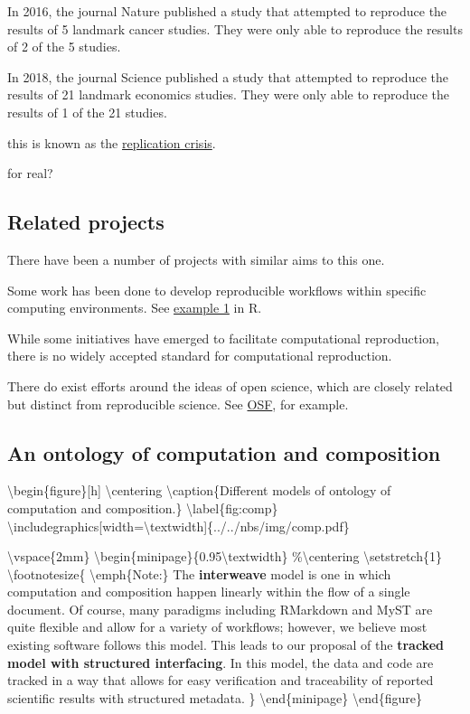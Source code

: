 In 2016, the journal Nature published a study that attempted to reproduce the results of 5 landmark cancer studies. They were only able to reproduce the results of 2 of the 5 studies.

In 2018, the journal Science published a study that attempted to reproduce the results of 21 landmark economics studies. They were only able to reproduce the results of 1 of the 21 studies.

this is known as the \href{https://en.wikipedia.org/wiki/Replication\_crisis}{replication crisis}.

for real?

\hypertarget{related-projects}{%
\subsection{Related projects}\label{related-projects}}

There have been a number of projects with similar aims to this one.

Some work has been done to develop reproducible workflows within specific computing environments. See \href{https://mine-cetinkaya-rundel.github.io/improve-repro-workflow-reproducibilitea-2020/}{example 1} in R.

While some initiatives have emerged to facilitate computational reproduction, there is no widely accepted standard for computational reproduction. 

There do exist efforts around the ideas of open science, which are closely related but distinct from reproducible science. See \href{https://osf.io/tvyxz/}{OSF}, for example.

\hypertarget{an-ontology-of-computation-and-composition}{%
\subsection{An ontology of computation and composition}\label{an-ontology-of-computation-and-composition}}

\textbackslash{}begin\{figure\}[h]
\textbackslash{}centering
\textbackslash{}caption\{Different models of ontology of computation and composition.\}
\textbackslash{}label\{fig:comp\}
\textbackslash{}includegraphics[width=\textbackslash{}textwidth]\{../../nbs/img/comp.pdf\}

\textbackslash{}vspace\{2mm\}
\textbackslash{}begin\{minipage\}\{0.95\textbackslash{}textwidth\}
\%\textbackslash{}centering
\textbackslash{}setstretch\{1\}
\textbackslash{}footnotesize\{
\textbackslash{}emph\{Note:\} The \textbf{interweave} model is one in which computation and composition happen linearly within the flow of a single document. Of course, many paradigms including RMarkdown and MyST are quite flexible and allow for a variety of workflows; however, we believe most existing software follows this model. This leads to our proposal of the \textbf{tracked model with structured interfacing}. In this model, the data and code are tracked in a way that allows for easy verification and traceability of reported scientific results with structured metadata.
\}
\textbackslash{}end\{minipage\}
\textbackslash{}end\{figure\}

